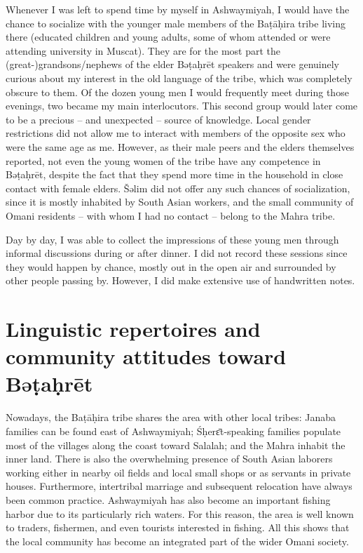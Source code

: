 \documentclass[output=paper]{langscibook}
\begin{document}
Whenever I was left to spend time by myself in Ashwaymiyah, I would have the chance to socialize with the younger male members of the Baṭāḥira tribe living there (educated children and young adults, some of whom attended or were attending university in Muscat). They are for the most part the (great-)grandsons/nephews of the elder Bəṭaḥrēt speakers and were genuinely curious about my interest in the old language of the tribe, which was completely obscure to them. Of the dozen young men I would frequently meet during those evenings, two became my main interlocutors. This second group would later come to be a precious – and unexpected – source of knowledge. Local gender restrictions did not allow me to interact with members of the opposite sex who were the same age as me. However, as their male peers and the elders themselves reported, not even the young women of the tribe have any competence in Bəṭaḥrēt, despite the fact that they spend more time in the household in close contact with female elders. Šəlim did not offer any such chances of socialization, since it is mostly inhabited by South Asian workers, and the small community of Omani residents – with whom I had no contact – belong to the Mahra tribe. 

Day by day, I was able to collect the impressions of these young men through informal discussions during or after dinner. I did not record these sessions since they would happen by chance, mostly out in the open air and surrounded by other people passing by. However, I did make extensive use of handwritten notes.



\section{Linguistic repertoires and community attitudes toward Bəṭaḥrēt}
Nowadays, the Baṭāḥira tribe shares the area with other local tribes: Janaba families can be found east of Ashwaymiyah; Śḥerɛ̄t-speaking families populate most of the villages along the coast toward Salalah; and the Mahra inhabit the inner land. There is also the overwhelming presence of South Asian laborers working either in nearby oil fields and local small shops or as servants in private houses. Furthermore, intertribal marriage and subsequent relocation have always been common practice. Ashwaymiyah has also become an important fishing harbor due to its particularly rich waters. For this reason, the area is well known to traders, fishermen, and even tourists interested in fishing. All this shows that the local community has become an integrated part of the wider Omani society.
\end{document}
